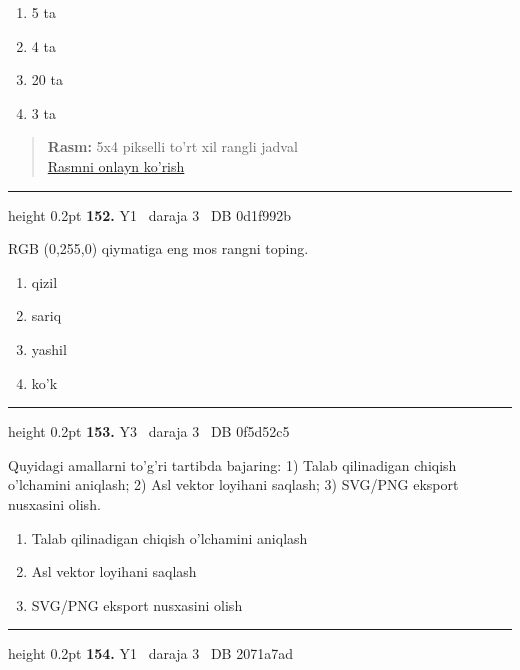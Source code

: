 \documentclass[10pt,a4paper,oneside]{article}
\begin{document}
\begin{enumerate}[label=\Alph*),leftmargin=9mm]
\item 5 ta
\item 4 ta
\item 20 ta
\item 3 ta
\end{enumerate}
\begin{quote}\footnotesize\color{muted}\textbf{Rasm:} 5x4 pikselli to'rt xil rangli jadval\\
\href{https://github.com/sarvar9417/attestatsiya/blob/main/public/graphics-web-v2/palette_grid.svg}{Rasmni onlayn ko'rish}
\end{quote}
\vspace{2mm}\hrule height 0.2pt \vspace{4mm}
\hypertarget{q152}{\textbf{\color{ink}152.}}  {\color{muted}\scriptsize Y1 \textbullet\ daraja 3 \textbullet\ DB 0d1f992b}
\par
RGB (0,255,0) qiymatiga eng mos rangni toping.
\begin{enumerate}[label=\Alph*),leftmargin=9mm]
\item qizil
\item sariq
\item yashil
\item ko'k
\end{enumerate}
\vspace{2mm}\hrule height 0.2pt \vspace{4mm}
\hypertarget{q153}{\textbf{\color{ink}153.}}  {\color{muted}\scriptsize Y3 \textbullet\ daraja 3 \textbullet\ DB 0f5d52c5}
\par
Quyidagi amallarni to'g'ri tartibda bajaring: 1) Talab qilinadigan chiqish o'lchamini aniqlash; 2) Asl vektor loyihani saqlash; 3) SVG/PNG eksport nusxasini olish.
\begin{enumerate}[label=\Alph*),leftmargin=9mm]
\item Talab qilinadigan chiqish o'lchamini aniqlash
\item Asl vektor loyihani saqlash
\item SVG/PNG eksport nusxasini olish
\end{enumerate}
\vspace{2mm}\hrule height 0.2pt \vspace{4mm}
\hypertarget{q154}{\textbf{\color{ink}154.}}  {\color{muted}\scriptsize Y1 \textbullet\ daraja 3 \textbullet\ DB 2071a7ad}
\par
\end{document}
